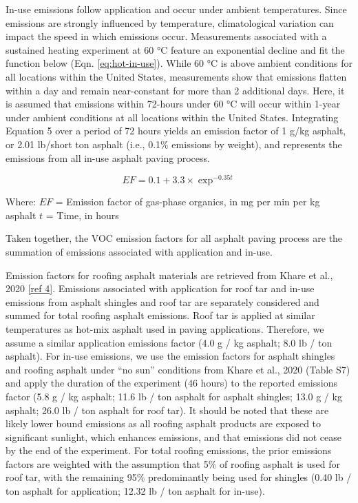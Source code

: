 \documentclass[
  11pt,
  oneside]{book}
\begin{document}
In-use emissions follow application and occur under ambient temperatures. Since emissions are strongly influenced by temperature, climatological variation can impact the speed in which emissions occur. Measurements associated with a sustained heating experiment at 60 °C feature an exponential decline and fit the function below (Eqn. \eqref{eq:hot-in-use}). While 60 °C is above ambient conditions for all locations within the United States, measurements show that emissions flatten within a day and remain near-constant for more than 2 additional days. Here, it is assumed that emissions within 72-hours under 60 °C will occur within 1-year under ambient conditions at all locations within the United States. Integrating Equation 5 over a period of 72 hours yields an emission factor of 1 g/kg asphalt, or 2.01 lb/short ton asphalt (i.e., 0.1\% emissions by weight), and represents the emissions from all in-use asphalt paving process.

\begin{equation} 
  EF = 0.1 + 3.3 \times \exp^{-0.35t}
  \label{eq:hot-in-use}
\end{equation}

Where: \newline
\(EF\) = Emission factor of gas-phase organics, in mg per min per kg asphalt \newline
\(t\) = Time, in hours \newline

Taken together, the VOC emission factors for all asphalt paving process are the summation of emissions associated with application and in-use.

Emission factors for roofing asphalt materials are retrieved from Khare et al., 2020 \hyperref[asphalt-references]{{[}ref 4{]}}. Emissions associated with application for roof tar and in-use emissions from asphalt shingles and roof tar are separately considered and summed for total roofing asphalt emissions. Roof tar is applied at similar temperatures as hot-mix asphalt used in paving applications. Therefore, we assume a similar application emissions factor (4.0 g / kg asphalt; 8.0 lb / ton asphalt). For in-use emissions, we use the emission factors for asphalt shingles and roofing asphalt under ``no sun'' conditions from Khare et al., 2020 (Table S7) and apply the duration of the experiment (46 hours) to the reported emissions factor (5.8 g / kg asphalt; 11.6 lb / ton asphalt for asphalt shingles; 13.0 g / kg asphalt; 26.0 lb / ton asphalt for roof tar). It should be noted that these are likely lower bound emissions as all roofing asphalt products are exposed to significant sunlight, which enhances emissions, and that emissions did not cease by the end of the experiment. For total roofing emissions, the prior emissions factors are weighted with the assumption that 5\% of roofing asphalt is used for roof tar, with the remaining 95\% predominantly being used for shingles (0.40 lb / ton asphalt for application; 12.32 lb / ton asphalt for in-use).
\end{document}
